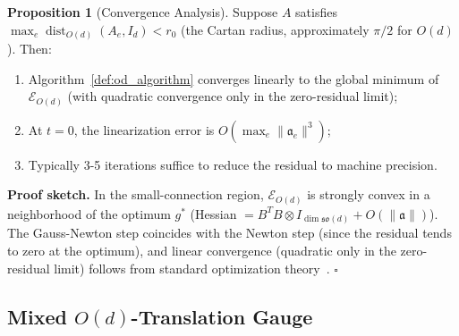 \documentclass[12pt,a4paper]{article}
\theoremstyle{definition}
\newtheorem{proposition}{Proposition}[section]
\theoremstyle{remark}
\theoremstyle{definition}
\newcommand{\Od}{O(d)}
\DeclareMathOperator{\dist}{dist}
\begin{document}
\begin{proposition}[Convergence Analysis]\label{prop:od_convergence}
Suppose $A$ satisfies $\max_e \dist_{\Od}(A_e, I_d) < r_0$ (the Cartan radius, approximately $\pi/2$ for $\Od$).
Then:
\begin{enumerate}[label=(\roman*)]
    \item Algorithm~\ref{def:od_algorithm} converges linearly to the global minimum of $\mathcal{E}_{\Od}$ (with quadratic convergence only in the zero-residual limit);
    \item At $t=0$, the linearization error is $O(\max_e \|\mathfrak{a}_e\|^3)$;
    \item Typically 3-5 iterations suffice to reduce the residual to machine precision.
\end{enumerate}

\textbf{Proof sketch.}
In the small-connection region, $\mathcal{E}_{\Od}$ is strongly convex in a neighborhood of the optimum $g^*$
(Hessian $= B^T B \otimes I_{\dim \mathfrak{so}(d)} + O(\|\mathfrak{a}\|)$).
The Gauss-Newton step coincides with the Newton step (since the residual tends to zero at the optimum),
and linear convergence (quadratic only in the zero-residual limit) follows from standard optimization theory~\cite{nocedal2006}. $\square$
\end{proposition}

\subsection{Mixed $O(d)$-Translation Gauge}
\end{document}
